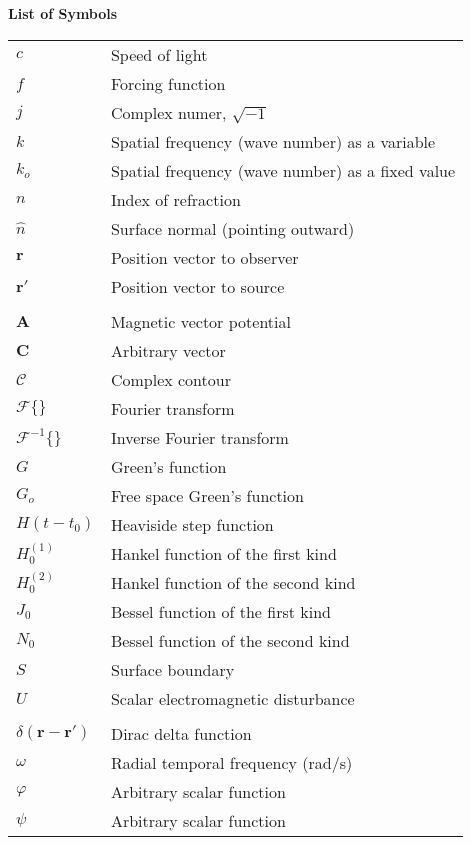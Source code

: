 \noindent\Large{\bf{List of Symbols}}

\vspace{24pt}

\small\normalsize
\begin{supertabular}{ll}
$c$ & Speed of light \\
$f$ & Forcing function \\
$j$ & Complex numer, $\sqrt{-1}$ \\
$k$ & Spatial frequency (wave number) as a variable\\
$k_o$ & Spatial frequency (wave number) as a fixed value \\
$n$ & Index of refraction \\
$\hat{n}$ & Surface normal (pointing outward) \\
$\mathbf{r}$ & Position vector to observer \\
$\mathbf{r}'$ & Position vector to source \\
\\
$\mathbf{A}$ & Magnetic vector potential \\
$\mathbf{C}$ & Arbitrary vector \\
$\mathcal{C}$ & Complex contour \\
$\mathcal{F}\{\}$ & Fourier transform \\
$\mathcal{F}^{-1}\{\}$ & Inverse Fourier transform \\
$G$ & Green's function \\
$G_o$ & Free space Green's function \\
$H(t-t_0)$ & Heaviside step function \\
$H_0^{(1)}$ & Hankel function of the first kind \\
$H_0^{(2)}$ & Hankel function of the second kind \\
$J_0$ & Bessel function of the first kind \\
$N_0$ & Bessel function of the second kind \\
$S$ & Surface boundary \\
$U$ & Scalar electromagnetic disturbance\\
\\
$\delta\left(\mathbf{r}-\mathbf{r}' \right)$ & Dirac delta function \\
$\omega$ & Radial temporal frequency (rad/s)\\
$\varphi$ & Arbitrary scalar function\\
$\psi$ & Arbitrary scalar function\\
\end{supertabular}